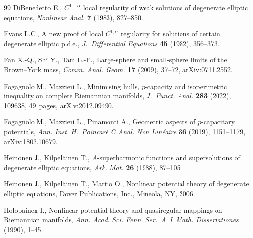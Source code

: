 \begin{thebibliography}{99}
DiBenedetto E., {$C^{1+\alpha}$} local regularity of weak solutions of
 degenerate elliptic equations, \href{https://doi.org/10.1016/0362-546X(83)90061-5}{\textit{Nonlinear Anal.}} \textbf{7} (1983),
 827--850.

Evans L.C., A new proof of local {$C^{1,\alpha }$} regularity for solutions of
 certain degenerate elliptic p.d.e., \href{https://doi.org/10.1016/0022-0396(82)90033-X}{\textit{J.~Differential Equations}}
 \textbf{45} (1982), 356--373.

Fan X.-Q., Shi Y., Tam L.-F., Large-sphere and small-sphere limits of the
 {B}rown--{Y}ork mass, \href{https://doi.org/10.4310/CAG.2009.v17.n1.a3}{\textit{Comm. Anal. Geom.}} \textbf{17} (2009), 37--72,
 \href{https://arxiv.org/abs/0711.2552}{arXiv:0711.2552}.

Fogagnolo M., Mazzieri L., Minimising hulls, {$p$}-capacity and isoperimetric
 inequality on complete {R}iemannian manifolds, \href{https://doi.org/10.1016/j.jfa.2022.109638}{\textit{J.~Funct. Anal.}}
 \textbf{283} (2022), 109638, 49~pages, \href{https://arxiv.org/abs/2012.09490}{arXiv:2012.09490}.

Fogagnolo M., Mazzieri L., Pinamonti A., Geometric aspects of {$p$}-capacitary
 potentials, \href{https://doi.org/10.1016/j.anihpc.2018.11.005}{\textit{Ann. Inst. H.~Poincar\'e C Anal. Non Lin\'eaire}}
 \textbf{36} (2019), 1151--1179, \href{https://arxiv.org/abs/1803.10679}{arXiv:1803.10679}.

Heinonen J., Kilpel\"ainen T., {$A$}-superharmonic functions and supersolutions
 of degenerate elliptic equations, \href{https://doi.org/10.1007/BF02386110}{\textit{Ark. Mat.}} \textbf{26} (1988),
 87--105.

Heinonen J., Kilpel\"ainen T., Martio O., Nonlinear potential theory of
 degenerate elliptic equations, Dover Publications, Inc., Mineola, NY, 2006.

Holopainen I., Nonlinear potential theory and quasiregular mappings on
 {R}iemannian manifolds, \textit{Ann. Acad. Sci. Fenn. Ser.~A~I~Math.
 Dissertationes} (1990), 1--45.


\end{thebibliography}
